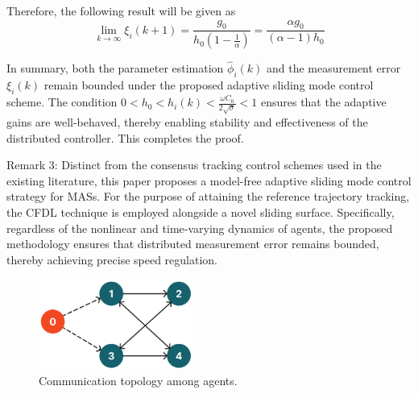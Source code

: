 \documentclass[journal,onecolumn]{IEEEtran}
\begin{document}
Therefore, the following result will be given as
\begin{equation}
    \label{model:lim_fin}
    \lim_{k \to \infty} \xi_i(k+1) = \frac{g_0}{h_0(1-\frac{1}{\alpha})} = \frac{\alpha g_0}{(\alpha-1)h_0}
\end{equation}

In summary, both the parameter estimation $\hat{\phi}_i(k)$ and the measurement error $\xi_i(k)$ remain bounded under the proposed adaptive sliding mode control scheme. The condition $0 < h_0 < h_i(k) < \frac{\omega C_0}{2\sqrt{\sigma}} < 1$ ensures that the adaptive gains are well-behaved, thereby enabling stability and effectiveness of the distributed controller. This completes the proof.


Remark 3: Distinct from the consensus tracking control schemes used in the existing literature, this paper proposes a model-free adaptive sliding mode control strategy for MASs. For the purpose of attaining the reference trajectory tracking, the CFDL technique is employed alongside a novel sliding surface. Specifically, regardless of the nonlinear and time-varying dynamics of agents, the proposed methodology ensures that distributed measurement error remains bounded, thereby achieving precise speed regulation.

\begin{figure}[H]
    \centering
    \includegraphics[width=0.45\textwidth]{communication.png}
    \caption{Communication topology among agents.}
    \label{fig:communication1} %
\end{figure}




\end{document}

